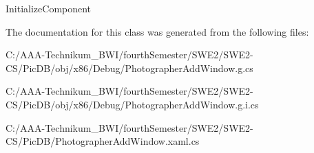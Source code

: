 Initialize\+Component 



The documentation for this class was generated from the following files\+:\begin{DoxyCompactItemize}
\item 
C\+:/\+A\+A\+A-\/\+Technikum\+\_\+\+B\+W\+I/fourth\+Semester/\+S\+W\+E2/\+S\+W\+E2-\/\+C\+S/\+Pic\+D\+B/obj/x86/\+Debug/Photographer\+Add\+Window.\+g.\+cs\item 
C\+:/\+A\+A\+A-\/\+Technikum\+\_\+\+B\+W\+I/fourth\+Semester/\+S\+W\+E2/\+S\+W\+E2-\/\+C\+S/\+Pic\+D\+B/obj/x86/\+Debug/Photographer\+Add\+Window.\+g.\+i.\+cs\item 
C\+:/\+A\+A\+A-\/\+Technikum\+\_\+\+B\+W\+I/fourth\+Semester/\+S\+W\+E2/\+S\+W\+E2-\/\+C\+S/\+Pic\+D\+B/Photographer\+Add\+Window.\+xaml.\+cs\end{DoxyCompactItemize}
